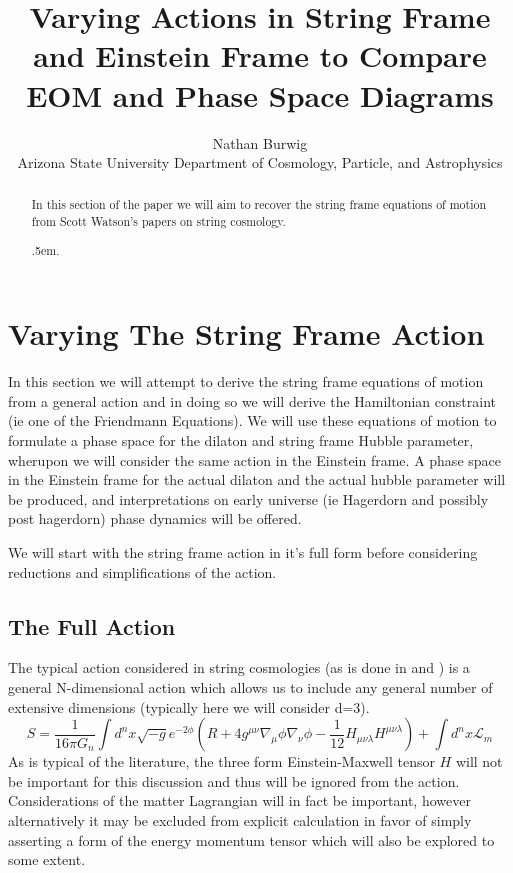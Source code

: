 \documentclass[preprint]{ptephy_v1}
\makeatletter
\newcommand \Dotfill {\leavevmode \cleaders \hb@xt@ .5em{\hss .\hss }\hfill \kern \z@}
\makeatother
\begin{document}
\title{Varying Actions in String Frame and Einstein Frame to Compare EOM and
Phase Space Diagrams}
\author{Nathan Burwig\\
\small Arizona State University Department of Cosmology, Particle, and Astrophysics}

\begin{abstract}
    In this section of the paper we will aim to recover the string frame
    equations of motion from Scott Watson's papers on string cosmology.
    \vspace{-3pt}

    \Dotfill
\end{abstract}

\maketitle
\newpage
\section{Varying The String Frame Action}
    In this section we will attempt to derive the string frame equations of
    motion from a general action and in doing so we will derive the Hamiltonian
    constraint (ie one of the Friendmann Equations). We will use these
    equations of motion to formulate a phase space for the dilaton and string
    frame Hubble parameter, wherupon we will consider the same action in the
    Einstein frame. A phase space in the Einstein frame for the actual dilaton
    and the actual hubble parameter will be produced, and interpretations on
    early universe (ie Hagerdorn and possibly post hagerdorn) phase dynamics
    will be offered.

    We will start with the string frame action in it's full form before
    considering reductions and simplifications of the action.

    \subsection{The Full Action}
    The typical action considered in string cosmologies (as is done in
    \cite{vafa} and \cite{kaloper}) is a general N-dimensional action which
    allows us to include any general number of extensive dimensions (typically
    here we will consider d=3).
    \begin{equation}
        S=\frac{1}{16\pi G_n} \int d^nx\sqrt{-g}e^{-2\phi}\left(
        R+4g^{\mu\nu}\nabla_{\mu}\phi\nabla_{\nu}\phi-\frac{1}{12}
        H_{\mu\nu\lambda}H^{\mu\nu\lambda} \right) + \int d^nx \mathcal{L}_m
    \end{equation}
    As is typical of the literature, the three form Einstein-Maxwell tensor
    $H$ will not be important for this discussion and thus will be ignored from
    the action. Considerations of the matter Lagrangian will in fact be
    important, however alternatively it may be excluded from explicit
    calculation in favor of simply asserting a form of the energy momentum
    tensor which will also be explored to some extent.
\end{document}
